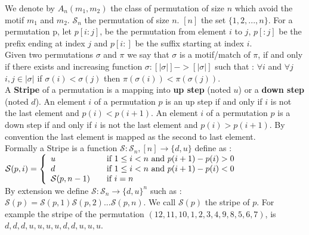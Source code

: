 \documentclass[12pt, a4paper]{article}
\newcommand{\Perm}[1]{\mathcal{S}_{#1}}
\newcommand{\ptext}{\pi}
\newcommand{\pmotif}{\sigma}
\newcommand{\dstep}{d}
\newcommand{\ustep}{u}
\begin{document}
		We denote by $A_{n}(m_1,m_2)$ the class
		of permutation of size $n$ which avoid 
		the motif $m_1$ and $m_2$. 
		$\Perm{n}$ the permutation of size $n$.
		$[n]$ the set $\{1,2,...,n\}.$
		For a permutation p, let $p[i:j]$, 
		be the permutation from element $i$ to $j$,
		$p[:j]$ be the prefix ending at index $j$
		and $p[i:]$ be the suffix starting at index $i$.\\
		
		Given two permutations
		$\pmotif$ and $\ptext$
		we say that $\pmotif$
		is a motif/match of
		$\ptext$,
		if and only if
		there exists 
		and increasing function 
		$\sigma:[|\pmotif|]->[|\pmotif|]$
		such that : $\forall i$ and 
		$\forall j$ $i,j \in |\pmotif| $
		if $\pmotif(i)<\pmotif(j)$
		then $\ptext(\sigma(i))<\ptext(\sigma(j))$.\\
		
		
		A \textbf{Stripe} of a permutation
		 is a mapping into \textbf{up step} (noted $\ustep$) 
		or a \textbf{down step} (noted $\dstep$).
		An element $i$ of a permutation $p$ is an up step if and only if $i$ is not the last element and $p(i)<p(i+1)$.
		An element $i$ of a permutation $p$ is a down step if and only if $i$ is not the last element and $p(i)>p(i+1)$.	
		By convention the last element is mapped as the second to last element.\\ 	
		Formally a Stripe is a function $\mathcal{S} : \Perm{n},[n] \to \{\dstep,\ustep\}$ define as :\\
		$ \mathcal{S}(p,i) = \left\{ 
		  \begin{array}{l l}
		    \ustep & \quad \text{if $1 \leq i<n$ and $p(i+1)-p(i)>0$ }\\
		    \dstep & \quad \text{if $1 \leq i<n$ and $p(i+1)-p(i)<0$ }\\
		     \mathcal{S}(p,n-1) & \quad \text{if $i=n$}\\
		  \end{array} \right. $\\
		  
		By extension we define  $\mathcal{S} : \Perm{n} \to \{\dstep,\ustep\}^{n}$ such as :
		$\mathcal{S}(p)=\mathcal{S}(p,1)\mathcal{S}(p,2)...\mathcal{S}(p,n)$.
		We call $\mathcal{S}(p)$ the stripe of $p$.
		For example the stripe of the permutation $(12,11,10,1,2,3,4,9,8,5,6,7)$, 
		is $\dstep,\dstep,\dstep,\ustep,\ustep,\ustep,\ustep,\dstep,\dstep,\ustep,\ustep,\ustep$.\\
		  
\end{document}
